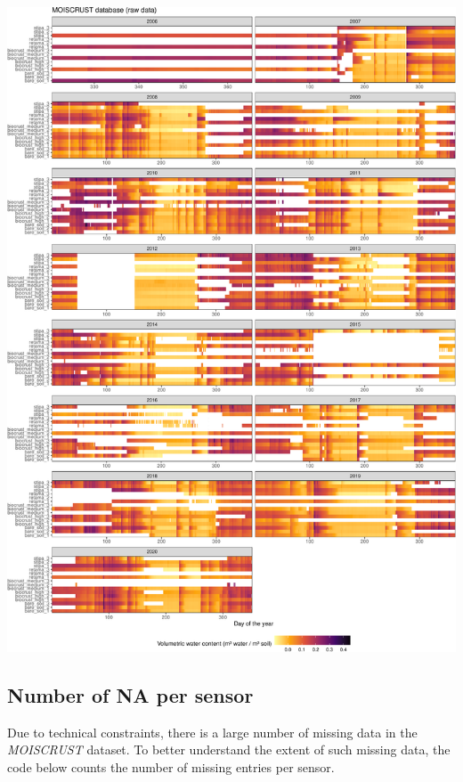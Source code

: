 \documentclass[]{article}
\begin{document}
\includegraphics{moiscrust_files/figure-latex/unnamed-chunk-8-1.pdf}

\hypertarget{number-of-na-per-sensor}{%
\subsection{Number of NA per sensor}\label{number-of-na-per-sensor}}

Due to technical constraints, there is a large number of missing data in
the \emph{MOISCRUST} dataset. To better understand the extent of such
missing data, the code below counts the number of missing entries per
sensor.
\end{document}

